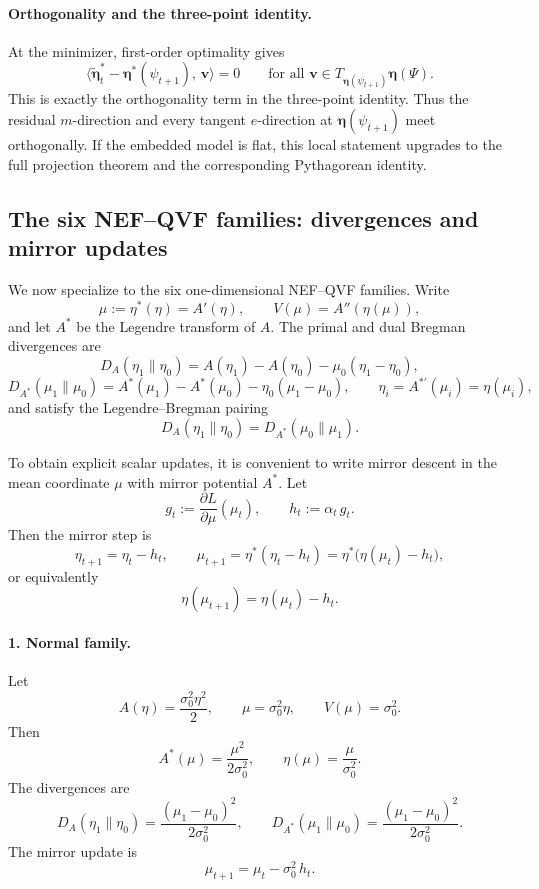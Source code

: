 \documentclass[11pt]{article}
\newcommand{\be}{{\bm{\eta}}}
\begin{document}
\paragraph{Orthogonality and the three-point identity.}
At the minimizer, first-order optimality gives
\[
\bigl\langle \tilde{\be}_t^\ast-\be^\ast(\psi_{t+1}),\,\boldsymbol{v}\bigr\rangle=0
\qquad
\text{for all }\boldsymbol{v}\in T_{\be(\psi_{t+1})}\be(\Psi).
\]
This is exactly the orthogonality term in the three-point identity. Thus the residual \(m\)-direction and every tangent \(e\)-direction at \(\be(\psi_{t+1})\) meet orthogonally. If the embedded model is flat, this local statement upgrades to the full projection theorem and the corresponding Pythagorean identity.

\subsection{The six NEF--QVF families: divergences and mirror updates}

We now specialize to the six one-dimensional NEF--QVF families. Write
\[
\mu:=\eta^\ast(\eta)=A'(\eta),
\qquad
V(\mu)=A''(\eta(\mu)),
\]
and let \(A^\ast\) be the Legendre transform of \(A\). The primal and dual Bregman divergences are
\[
D_A(\eta_1\|\eta_0)
=
A(\eta_1)-A(\eta_0)-\mu_0(\eta_1-\eta_0),
\]
\[
D_{A^\ast}(\mu_1\|\mu_0)
=
A^\ast(\mu_1)-A^\ast(\mu_0)-\eta_0(\mu_1-\mu_0),
\qquad
\eta_i=A^{\ast\prime}(\mu_i)=\eta(\mu_i),
\]
and satisfy the Legendre--Bregman pairing
\[
D_A(\eta_1\|\eta_0)=D_{A^\ast}(\mu_0\|\mu_1).
\]

To obtain explicit scalar updates, it is convenient to write mirror descent in the mean coordinate \(\mu\) with mirror potential \(A^\ast\). Let
\[
g_t:=\frac{\partial L}{\partial \mu}(\mu_t),
\qquad
h_t:=\alpha_t\,g_t.
\]
Then the mirror step is
\[
\eta_{t+1}=\eta_t-h_t,
\qquad
\mu_{t+1}=\eta^\ast(\eta_t-h_t)=\eta^\ast\!\bigl(\eta(\mu_t)-h_t\bigr),
\]
or equivalently
\[
\eta(\mu_{t+1})=\eta(\mu_t)-h_t.
\]

\paragraph{1. Normal family.}
Let
\[
A(\eta)=\frac{\sigma_0^2\eta^2}{2},
\qquad
\mu=\sigma_0^2\eta,
\qquad
V(\mu)=\sigma_0^2.
\]
Then
\[
A^\ast(\mu)=\frac{\mu^2}{2\sigma_0^2},
\qquad
\eta(\mu)=\frac{\mu}{\sigma_0^2}.
\]
The divergences are
\[
D_A(\eta_1\|\eta_0)=\frac{(\mu_1-\mu_0)^2}{2\sigma_0^2},
\qquad
D_{A^\ast}(\mu_1\|\mu_0)=\frac{(\mu_1-\mu_0)^2}{2\sigma_0^2}.
\]
The mirror update is
\[
\mu_{t+1}=\mu_t-\sigma_0^2\,h_t.
\]
\end{document}
